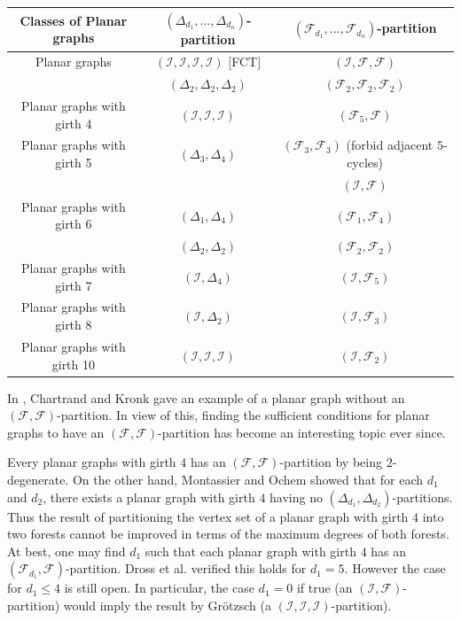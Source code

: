 \documentclass[11pt]{amsart} %
\theoremstyle{definition}
\begin{document}
 
\begin{center}
	\begin{tabular}{ |c|c|c| } 
		\hline
		Classes of Planar graphs  & $(\Delta_{d_1}, \dots,  \Delta_{d_n})$-partition & $(\mathcal{F}_{d_1}, \dots,  \mathcal{F}_{d_n})$-partition \\ 
	\hline
	Planar graphs& $(\mathcal{I},\mathcal{I},\mathcal{I},\mathcal{I})$ [FCT] & $(\mathcal{I},\mathcal{F},\mathcal{F})$ \cite{IFF} \\ 
		 & $(\Delta_2,\Delta_2,\Delta_2)$ \cite{222}& $(\mathcal{F}_2,\mathcal{F}_2,\mathcal{F}_2)$ \cite{F2F2F2} \\ 
	\hline
	Planar graphs with girth 4& $(\mathcal{I},\mathcal{I},\mathcal{I})$ \cite{000C3} & $(\mathcal{F}_5,\mathcal{F})$ \cite{F5FG4} \\ 
	\hline
	Planar graphs with girth 5& $(\Delta_3,\Delta_4)$\cite{34G5}  & $(\mathcal{F}_3,\mathcal{F}_3)$ (forbid adjacent $5$-cycles) \cite{F33G5} \\ 
	&  & $(\mathcal{I},\mathcal{F})$ \cite{IFG5} \\ 
	\hline
	Planar graphs with girth 6& $(\Delta_1,\Delta_4)$  \cite{02o04o14G8} & $(\mathcal{F}_1,\mathcal{F}_4)$ \cite{F1F4G6}  \\ 
	& $(\Delta_2,\Delta_2)$ \cite{22G6} & $(\mathcal{F}_2,\mathcal{F}_2)$ \cite{F2F2G6} \\ 
	\hline
	Planar graphs with girth 7& $(\mathcal{I},\Delta_4)$ \cite{02o04o14G8} & $(\mathcal{I},\mathcal{F}_5)$  \cite{IF235}\\ 
	\hline
	Planar graphs with girth 8& $(\mathcal{I},\Delta_2)$ \cite{02o04o14G8} & $(\mathcal{I},\mathcal{F}_3)$ \cite{IF235} \\ 
	\hline
	Planar graphs with girth 10& $(\mathcal{I},\mathcal{I},\mathcal{I})$ \cite{IF235} & $(\mathcal{I},\mathcal{F}_2)$ \cite{IF235}  \\ 
	\hline
	\end{tabular}
\end{center}
 
 
 
In \cite{giveva3}, Chartrand and Kronk gave an example of 
a planar graph without an $(\mathcal{F},\mathcal{F})$-partition. 
In view of this, finding the sufficient conditions for planar graphs 
to have an $(\mathcal{F},\mathcal{F})$-partition has become 
an interesting topic ever since. 

Every planar graphs with girth $4$ has an $(\mathcal{F},\mathcal{F})$-partition 
by being  $2$-degenerate. 
On the other hand, Montassier and  Ochem \cite{NomnC3} 
showed that for each $d_1$ and $d_2$, there exists 
a planar graph with girth $4$ having no 
$(\Delta_{d_1},\Delta_{d_2})$-partitions. 
Thus the result of  partitioning the vertex set of  
a planar graph with girth $4$ into two forests cannot be improved 
in terms of the maximum degrees of both forests. 
At best, one may find $d_1$ such that each planar graph 
with girth $4$ has an $(\mathcal{F}_{d_1},\mathcal{F})$-partition. 
Dross et al. \cite{F5FG4} verified this holds for $d_1=5$. 
However the case for $d_1 \leq 4$ is still open. 
In particular, the case $d_1=0$ if true (an $(\mathcal{I},\mathcal{F})$-partition) 
would imply the result by Gr\"otzsch \cite{000C3} 
(a $(\mathcal{I},\mathcal{I},\mathcal{I})$-partition). 
\end{document}
